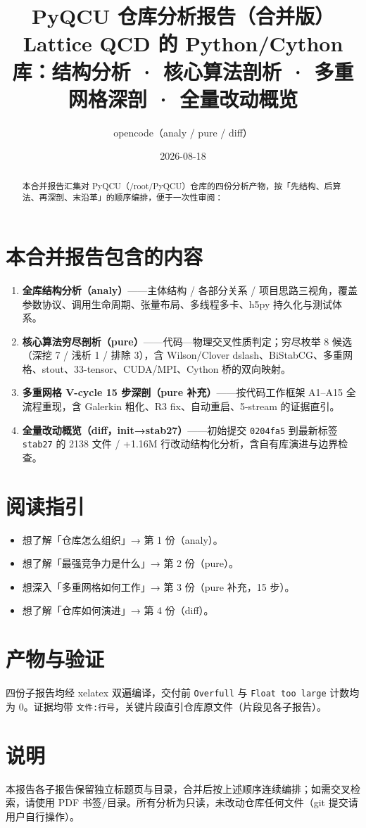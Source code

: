 \documentclass[UTF8]{ctexart}
\title{PyQCU 仓库分析报告（合并版）\\[6pt]\large Lattice QCD 的 Python/Cython 库：结构分析 · 核心算法剖析 · 多重网格深剖 · 全量改动概览}
\author{opencode（analy / pure / diff）}
\date{2026-08-18}
\begin{document}
\maketitle
\begin{abstract}
本合并报告汇集对 PyQCU（/root/PyQCU）仓库的四份分析产物，按「先结构、后算法、再深剖、末沿革」的顺序编排，便于一次性审阅：
\end{abstract}
\tableofcontents

\section{本合并报告包含的内容}
\begin{enumerate}
  \item \textbf{全库结构分析（analy）}——主体结构 / 各部分关系 / 项目思路三视角，覆盖参数协议、调用生命周期、张量布局、多线程多卡、h5py 持久化与测试体系。
  \item \textbf{核心算法穷尽剖析（pure）}——代码—物理交叉性质判定；穷尽枚举 8 候选（深挖 7 / 浅析 1 / 排除 3），含 Wilson/Clover dslash、BiStabCG、多重网格、stout、33-tensor、CUDA/MPI、Cython 桥的双向映射。
  \item \textbf{多重网格 V-cycle 15 步深剖（pure 补充）}——按代码工作框架 A1–A15 全流程重现，含 Galerkin 粗化、R3 fix、自动重启、5-stream 的证据直引。
  \item \textbf{全量改动概览（diff，init→stab27）}——初始提交 \texttt{0204fa5} 到最新标签 \texttt{stab27} 的 2138 文件 / +1.16M 行改动结构化分析，含自有库演进与边界检查。
\end{enumerate}

\section{阅读指引}
\begin{itemize}
  \item 想了解「仓库怎么组织」→ 第 1 份（analy）。
  \item 想了解「最强竞争力是什么」→ 第 2 份（pure）。
  \item 想深入「多重网格如何工作」→ 第 3 份（pure 补充，15 步）。
  \item 想了解「仓库如何演进」→ 第 4 份（diff）。
\end{itemize}

\section{产物与验证}
四份子报告均经 xelatex 双遍编译，交付前 \texttt{Overfull} 与 \texttt{Float too large} 计数均为 0。证据均带 \texttt{文件:行号}，关键片段直引仓库原文件（片段见各子报告）。

\section{说明}
本报告各子报告保留独立标题页与目录，合并后按上述顺序连续编排；如需交叉检索，请使用 PDF 书签/目录。所有分析为只读，未改动仓库任何文件（git 提交请用户自行操作）。
\end{document}
